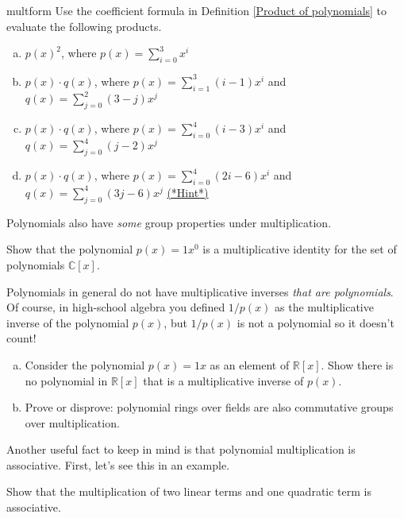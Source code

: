 \begin {exercise}{multform}
Use the coefficient formula in Definition \ref{Product of polynomials} to evaluate the following products.
\begin {enumerate}[(a)]
\item
$p(x)^2$, where $p(x) = \sum_{i=0}^{3} x^i$
\item
$p(x) \cdot q(x)$, where $p(x) = \sum_{i=1}^{3} (i-1)x^i$  and $q(x) = \sum_{j=0}^{2} (3-j)x^j$
\item
$p(x) \cdot q(x)$, where $p(x) = \sum_{i=0}^{4} (i-3)x^i$  and $q(x) = \sum_{j=0}^{4} (j-2)x^j$ 
\item
$p(x) \cdot q(x)$, where $p(x) = \sum_{i=0}^{4} (2i-6)x^i$  and $q(x) = \sum_{j=0}^{4} (3j-6)x^j$ 
\hyperref[sec:polyrings:hints]{(*Hint*)} 
\end{enumerate}
\end {exercise}


Polynomials also have \emph{some} group properties under multiplication.

\begin{exercise}{}
Show that the polynomial $p(x) = 1x^0$ is a multiplicative identity for the set of polynomials $\mathbb{C}[x]$.
\end{exercise}

Polynomials in general do not have multiplicative inverses \emph{that are polynomials}.  Of course, in high-school algebra you defined $1/p(x)$ as the multiplicative inverse of the polynomial $p(x)$, but $1/p(x)$ is not a polynomial so it doesn't count!

\begin{exercise}{}
\begin{enumerate}[(a)]
\item
Consider the  polynomial $p(x)= 1x$ as an element of $\mathbb{R}[x]$. Show there is no polynomial in $\mathbb{R}[x]$ that is a multiplicative inverse of $p(x)$.
\item
Prove or disprove: polynomial rings over fields are also commutative groups over multiplication.
\end{enumerate}
\end{exercise}

Another useful fact to keep in mind is that polynomial multiplication is associative.  First, let's see this in an example.


\begin{exercise}{}
Show that the multiplication of two linear terms and one quadratic term is associative.
\end{exercise}

